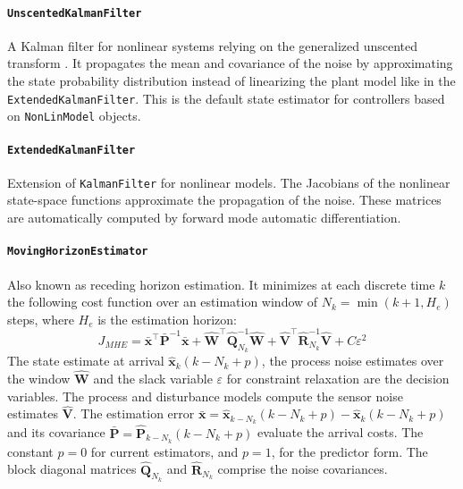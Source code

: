 \paragraph{\textnormal{\texttt{UnscentedKalmanFilter}}}
A Kalman filter for nonlinear systems relying on the generalized unscented transform \citep{simon}. It propagates the mean and covariance of the noise by approximating the state probability distribution instead of linearizing the plant model like in the \texttt{ExtendedKalmanFilter}. This is the default state estimator for controllers based on \texttt{NonLinModel} objects.

\paragraph{\textnormal{\texttt{ExtendedKalmanFilter}}}
Extension of \texttt{KalmanFilter} for nonlinear models. The Jacobians of the nonlinear state-space functions approximate the propagation of the noise. These matrices are automatically computed by forward mode automatic differentiation.

\paragraph{\textnormal{\texttt{MovingHorizonEstimator}}}
Also known as receding horizon estimation. It minimizes at each discrete time $k$ the following cost function over an estimation window of $N_k = \min(k+1, H_e)$ steps, where $H_e$ is the estimation horizon:
\begin{equation}\label{eq:J_MHE}
    J_{\mathit{MHE}} = \bar{\mathbf{x}}^\intercal \bar{\mathbf{P}}^{-1} \bar{\mathbf{x}} 
    + \mathbf{\hat{W}}^\intercal \mathbf{\hat{Q}}_{N_k}^{-1} \mathbf{\hat{W}}  
    + \mathbf{\hat{V}}^\intercal \mathbf{\hat{R}}_{N_k}^{-1} \mathbf{\hat{V}}
    + C \varepsilon^2
\end{equation}
The state estimate at arrival $\mathbf{\hat{x}}_k(k-N_k+p)$, the process noise estimates over the window $\mathbf{\hat{W}}$ and the slack variable $\varepsilon$ for constraint relaxation are the decision variables. The process and disturbance models compute the sensor noise estimates $\mathbf{\hat{V}}$. The estimation error $\bar{\mathbf{x}} = \mathbf{\hat{x}}_{k-N_k}(k-N_k+p) - \mathbf{\hat{x}}_{k}(k-N_k+p)$ and its covariance $\bar{\mathbf{P}} = \mathbf{\hat{P}}_{k-N_k}(k-N_k+p)$ evaluate the arrival costs. The constant $p=0$ for current estimators, and $p=1$, for the predictor form. The block diagonal matrices $\mathbf{\hat{Q}}_{N_k}$ and $\mathbf{\hat{R}}_{N_k}$ comprise the noise covariances.

